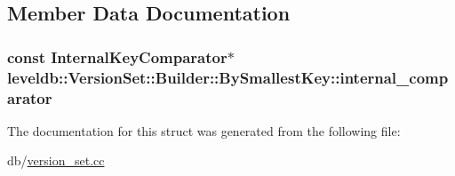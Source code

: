 \subsection{Member Data Documentation}
\hypertarget{structleveldb_1_1_version_set_1_1_builder_1_1_by_smallest_key_ac32b5858a81ad3f2c75faf836aac5abe}{}
\subsubsection[{internal\+\_\+comparator}]{\setlength{\rightskip}{0pt plus 5cm}const {\bf Internal\+Key\+Comparator}$\ast$ leveldb\+::\+Version\+Set\+::\+Builder\+::\+By\+Smallest\+Key\+::internal\+\_\+comparator}\label{structleveldb_1_1_version_set_1_1_builder_1_1_by_smallest_key_ac32b5858a81ad3f2c75faf836aac5abe}


The documentation for this struct was generated from the following file\+:\begin{DoxyCompactItemize}
\item 
db/\hyperlink{version__set_8cc}{version\+\_\+set.\+cc}\end{DoxyCompactItemize}
